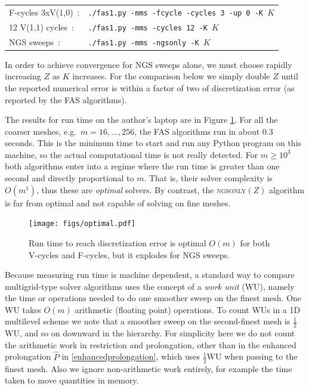 \documentclass[letterpaper,final,12pt,reqno]{amsart}
\begin{document}
\medskip
\begin{tabular}{ll}
\textsf{F-cycles 3xV(1,0)} \,:        &\texttt{./fas1.py -mms -fcycle -cycles 3 -up 0 -K }$K$ \\
\textsf{12 V(1,1) cycles} \,:  &\texttt{./fas1.py -mms -cycles 12 -K }$K$ \\
\textsf{NGS sweeps} \,:      &\texttt{./fas1.py -mms -ngsonly -K }$K$
\end{tabular}

\medskip
In order to achieve convergence for NGS sweeps alone, we must choose rapidly increasing $Z$ as $K$ increases.  For the comparison below we simply double $Z$ until the reported numerical error is within a factor of two of discretization error (as reported by the FAS algorithms).

The results for run time on the author's laptop are in Figure \ref{fig:optimal}.  For all the coarser meshes, e.g.~$m=16,\dots,256$, the FAS algorithms run in about 0.3 seconds.  This is the minimum time to start and run any Python program on this machine, so the actual computational time is not really detected.  For $m \ge 10^3$ both algorithms enter into a regime where the run time is greater than one second and directly proportional to $m$.  That is, their solver complexity is $O(m^1)$, thus these are \emph{optimal} \cite[Chapter 7]{Bueler2021} solvers.  By contrast, the \textsc{ngsonly}$(Z)$ algorithm is far from optimal and not capable of solving on fine meshes.

\begin{figure}
\texttt{[image: figs/optimal.pdf]}
\caption{Run time to reach discretization error is optimal $O(m)$ for both V-cycles and F-cycles, but it explodes for NGS sweeps.}
\label{fig:optimal}
\end{figure}

Because measuring run time is machine dependent, a standard way to compare multigrid-type solver algorithms uses the concept of a \emph{work unit} (WU), namely the time or operations needed to do one smoother sweep on the finest mesh.  One WU takes $O(m)$ arithmetic (floating point) operations.  To count WUs in a 1D multilevel scheme we note that a smoother sweep on the second-finest mesh is $\frac{1}{2}$WU, and so on downward in the hierarchy.  For simplicity here we do not count the arithmetic work in restriction and prolongation, other than in the enhanced prolongation $\hat P$ in \eqref{enhancedprolongation}, which uses $\frac{1}{2}$WU when passing to the finest mesh.  Also we ignore non-arithmetic work entirely, for example the time taken to move quantities in memory.
\end{document}
